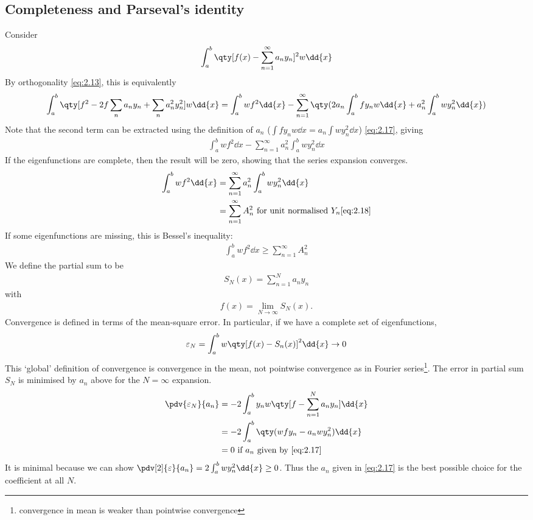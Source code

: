 \subsection{Completeness and Parseval's identity}
Consider
\begin{align*}
    \int_a^b \qty[ f(x) - \sum_{n=1}^\infty a_n y_n ]^2 w \dd{x}
\end{align*}
By orthogonality \cref{eq:2.13}, this is equivalently
\begin{align*}
    \int_a^b \qty[ f^2 - 2 f \sum_n a_n y_n + \sum_n a_n^2 y_n^2 ] w \dd{x} = \int_a^b wf^2 \dd{x} - \sum_{n=1}^{\infty} \qty( 2 a_n \int_a^b f y_n w \dd{x} + a_n^2 \int_a^b w y_n^2 \dd{x} )
\end{align*}
Note that the second term can be extracted using the definition of $a_n$ ($\int f y_n w \dd{x} = a_n \int w y_n^2 \dd{x}$) \cref{eq:2.17}, giving
\begin{align*}
    \int_a^b wf^2 \dd{x} - \sum_{n=1}^\infty a_n^2 \int_a^b w y_n^2 \dd{x}
\end{align*}
If the eigenfunctions are complete, then the result will be zero, showing that the series expansion converges.
\begin{align}
    \int_a^b w f^2 \dd{x} &= \sum_{n=1}^\infty a_n^2 \int_a^b w y_n^2 \dd{x} \label{eq:2.19} \\
    &= \sum_{n=1}^\infty A_n^2 \text{ for unit normalised } Y_n \cref{eq:2.18} \notag
\end{align}
If some eigenfunctions are missing, this is Bessel's inequality:
\begin{align*}
    \int_a^b w f^2 \dd{x} \geq \sum_{n=1}^\infty A_n^2
\end{align*}
We define the partial sum to be
\begin{align*}
    S_N(x) = \sum_{n=1}^N a_n y_n
\end{align*}
with 
\begin{align}
    f(x) = \lim_{N \to \infty} S_N(x) \label{eq:2.20}.
\end{align}
Convergence is defined in terms of the mean-square error.
In particular, if we have a complete set of eigenfunctions,
\begin{align*}
    \varepsilon_N = \int_a^b w \qty[f(x) - S_n(x)]^2 \dd{x} \to 0
\end{align*}
This `global' definition of convergence is convergence in the mean, not pointwise convergence as in Fourier series\footnote{convergence in mean is weaker than pointwise convergence}.
The error in partial sum $S_N$ is minimised by $a_n$ above for the $N = \infty$ expansion.
\begin{align*}
    \pdv{\varepsilon_N}{a_n} &= -2 \int_a^b y_n w \qty[ f - \sum_{n=1}^N a_n y_n ] \dd{x} \\
    &= -2 \int_a^b \qty(wfy_n - a_n w y_n^2) \dd{x} \\
    &= 0 \text{ if $a_n$ given by \cref{eq:2.17}}
\end{align*}
It is minimal because we can show $\pdv[2]{\varepsilon}{a_n} = 2 \int_a^b w y_n^2 \dd{x} \geq 0$.
Thus the $a_n$ given in \cref{eq:2.17} is the best possible choice for the coefficient at all $N$.

